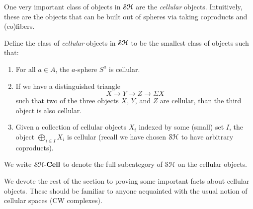 \documentclass[../main.tex]{subfiles}
\begin{document}
One very important class of objects in $\mathcal{SH}$ are the \emph{cellular} objects. Intuitively, these are the objects that can be built out of spheres via taking coproducts and (co)fibers.

\begin{definition}\label{cellular}
	Define the class of \emph{cellular} objects in $\mathcal{SH}$ to be the smallest class of objects such that:
	\begin{enumerate}
		\item For all $a\in A$, the $a$-sphere $S^a$ is cellular.
		\item If we have a distinguished triangle
		\[X\to Y\to Z\to\Sigma X\]
		such that two of the three objects $X$, $Y$, and $Z$ are cellular, than the third object is also cellular.
		\item Given a collection of cellular objects $X_i$ indexed by some (small) set $I$, the object $\bigoplus_{i\in I} X_i$ is cellular (recall we have chosen $\mathcal{SH}$ to have arbitrary coproducts).
	\end{enumerate}
	We write $\mathcal{SH}\text-\mathbf{Cell}$ to denote the full subcategory of $\mathcal{SH}$ on the cellular objects.
\end{definition}

We devote the rest of the section to proving some important facts about cellular objects. These should be familiar to anyone acquainted with the usual notion of cellular spaces (CW complexes).
\end{document}
